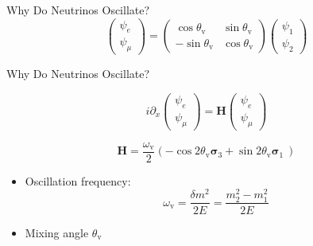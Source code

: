 \documentclass[9pt]{beamer}
\begin{document}
\begin{darkframes}
\begin{frame}{Why Do Neutrinos Oscillate?}
\begin{equation*}
\begin{pmatrix}
\psi_e\\
\psi_\mu
\end{pmatrix} = \begin{pmatrix}
\cos \theta_{\mathrm v} & \sin\theta_{\mathrm v} \\
-\sin \theta_{\mathrm v} & \cos \theta_{\mathrm v}
\end{pmatrix}\begin{pmatrix}
\psi_1\\
\psi_2
\end{pmatrix}
\end{equation*}

\end{frame}



\begin{frame}[fragile]{Why Do Neutrinos Oscillate?}





\begin{tcolorbox}[title=Equation of Motion]

\begin{equation*}
i\partial_x \begin{pmatrix}
\psi_e\\
\psi_\mu
\end{pmatrix} = \mathbf{H}\begin{pmatrix}
\psi_e\\
\psi_\mu
\end{pmatrix}
\end{equation*}

\end{tcolorbox}

\pause

\begin{tcolorbox}
\begin{equation*}
\mathbf{H} = \frac{\omega_{\mathrm v} }{2}\left( - \cos 2\theta_{\mathrm v } \boldsymbol{\sigma}_3  + \sin 2\theta_{\mathrm{v}} \boldsymbol{\sigma}_1\ \right)
\end{equation*}


\begin{itemize}
    \item \color{black} Oscillation frequency:
\begin{equation*}
    \omega_{\mathrm v} = \frac{\delta m^2}{2E}=\frac{m_2^2 - m_1^2}{2E}
\end{equation*}
\item \color{black} Mixing angle $\theta_{\mathrm v}$
\end{itemize}



\end{tcolorbox}
\end{frame}
\end{darkframes}
\end{document}
